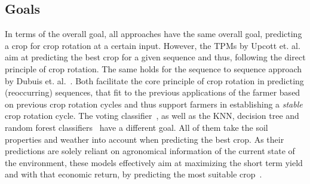 \documentclass{Academic}
\begin{document}
    \subsection{Goals}
    In terms of the overall goal, all approaches have the same overall goal, predicting a crop for crop rotation at a certain input. However, the TPMs by Upcott et. al.~\cite{upcott_new_2023} aim at predicting the best crop for a given sequence and thus, following the direct principle of crop rotation. The same holds for the sequence to sequence approach by Dubuis et. al.~\cite{dupuis_performances_2023}. Both facilitate the core principle of crop rotation in predicting (reoccurring) sequences, that fit to the previous applications of the farmer based on previous crop rotation cycles and thus support farmers in establishing a \textit{stable} crop rotation cycle. The voting classifier~\cite{pragathi_crop_nodate}, as well as the KNN, decision tree and random forest classifiers~\cite{rao_crop_2022} have a different goal. All of them take the soil properties and weather into account when predicting the best crop. As their predictions are solely reliant on agronomical information of the current state of the environment, these models effectively aim at maximizing the short term yield and with that economic return, by predicting the most suitable crop~\cite{pragathi_crop_nodate}.
\end{document}
